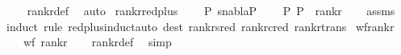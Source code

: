 \begin{isabellebody}
%
\isadelimproof
\ \ %
\endisadelimproof
%
\isatagproof
{}\isamarkupfalse%
\ rank{\isacharunderscore}{\kern0pt}r{\isacharunderscore}{\kern0pt}def\ \isamarkupfalse%
\ auto%
\endisatagproof
{\isafoldproof}%
%
\isadelimproof
\isanewline
%
\endisadelimproof
\isanewline
{}\isamarkupfalse%
\ rank{\isacharunderscore}{\kern0pt}r{\isacharunderscore}{\kern0pt}red{\isacharunderscore}{\kern0pt}plus{\isacharcolon}{\kern0pt}\ \isanewline
\ \ \ {\isachardoublequoteopen}P{}{\isasymTurnstile}\ {\isacharparenleft}{\kern0pt}s{\isacharcomma}{\kern0pt}nabla{\isacharparenright}{\kern0pt}{\isasymRightarrow}P{}{\isachardoublequoteclose}\ \isanewline
\ \ \ {\isachardoublequoteopen}{\isacharparenleft}{\kern0pt}P{}{\isacharcomma}{\kern0pt}\ P{}{\isacharparenright}{\kern0pt}\ {\isasymin}\ rank{\isacharunderscore}{\kern0pt}r{\isachardoublequoteclose}\isanewline
%
\isadelimproof
\ \ %
\endisadelimproof
%
\isatagproof
{}\isamarkupfalse%
\ assms\ \isanewline
{}\isamarkupfalse%
{\isacharparenleft}{\kern0pt}induct\ rule{\isacharcolon}{\kern0pt}\ red{\isacharunderscore}{\kern0pt}plus{\isachardot}{\kern0pt}induct{\isacharparenright}{\kern0pt}{\isacharparenleft}{\kern0pt}auto\ dest{\isacharcolon}{\kern0pt}\ rank{\isacharunderscore}{\kern0pt}r{\isacharunderscore}{\kern0pt}sred\ rank{\isacharunderscore}{\kern0pt}r{\isacharunderscore}{\kern0pt}cred\ rank{\isacharunderscore}{\kern0pt}r{\isacharunderscore}{\kern0pt}trans{\isacharparenright}{\kern0pt}%
\endisatagproof
{\isafoldproof}%
%
\isadelimproof
\isanewline
%
\endisadelimproof
\isanewline
{}\isamarkupfalse%
\ wf{\isacharunderscore}{\kern0pt}rank{\isacharunderscore}{\kern0pt}r{\isacharcolon}{\kern0pt}\ \isanewline
\ \ \ {\isachardoublequoteopen}wf\ {\isacharparenleft}{\kern0pt}rank{\isacharunderscore}{\kern0pt}r{\isacharparenright}{\kern0pt}{\isachardoublequoteclose}\isanewline
%
\isadelimproof
\ \ %
\endisadelimproof
%
\isatagproof
{}\isamarkupfalse%
\ rank{\isacharunderscore}{\kern0pt}r{\isacharunderscore}{\kern0pt}def\ \isamarkupfalse%
\ simp%
\endisatagproof
{\isafoldproof}%
%
\isadelimproof
\isanewline
%
\endisadelimproof
%
\isadelimtheory
%
\endisadelimtheory
%
\isatagtheory
%
\endisatagtheory
{\isafoldtheory}%
%
\isadelimtheory
%
\endisadelimtheory
%
\end{isabellebody}%
\endinput
